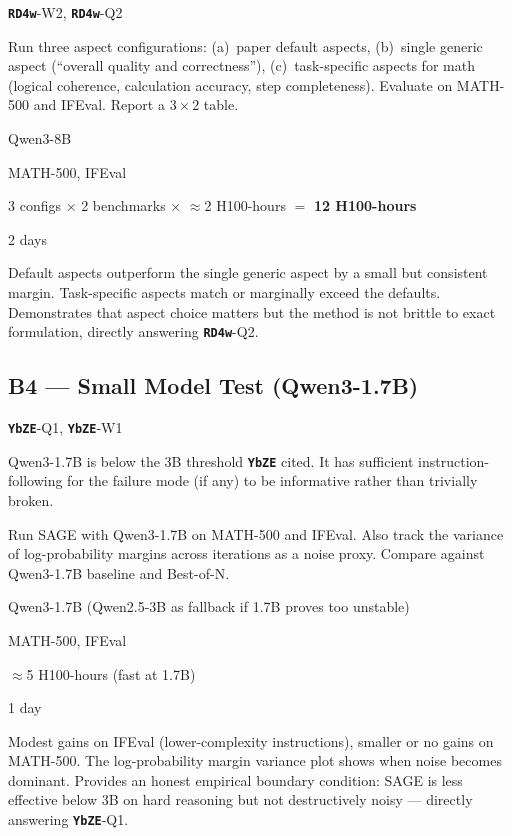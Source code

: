 \documentclass[11pt,a4paper]{article}
\newcommand{\rev}[1]{\texttt{\textbf{#1}}}
\begin{document}
\begin{description}[leftmargin=2cm, style=nextline]
  \item[Covers] \rev{RD4w}-W2, \rev{RD4w}-Q2
  \item[Procedure] Run three aspect configurations: (a)~paper default aspects,
    (b)~single generic aspect (``overall quality and correctness''), (c)~task-specific
    aspects for math (logical coherence, calculation accuracy, step completeness).
    Evaluate on MATH-500 and IFEval. Report a $3 \times 2$ table.
  \item[Model] Qwen3-8B
  \item[Benchmarks] MATH-500, IFEval
  \item[GPU estimate] 3 configs $\times$ 2 benchmarks $\times$ $\approx$2 H100-hours
    $=$ \textbf{12 H100-hours}
  \item[Wall-clock] 2 days
  \item[Expected outcome] Default aspects outperform the single generic aspect by a small but
    consistent margin. Task-specific aspects match or marginally exceed the defaults.
    Demonstrates that aspect choice matters but the method is not brittle to exact
    formulation, directly answering \rev{RD4w}-Q2.
\end{description}

\subsection*{B4 --- Small Model Test (Qwen3-1.7B)}

\begin{description}[leftmargin=2cm, style=nextline]
  \item[Covers] \rev{YbZE}-Q1, \rev{YbZE}-W1
  \item[Rationale] Qwen3-1.7B is below the 3B threshold \rev{YbZE} cited. It has sufficient
    instruction-following for the failure mode (if any) to be informative rather than
    trivially broken.
  \item[Procedure] Run SAGE with Qwen3-1.7B on MATH-500 and IFEval. Also track the variance
    of log-probability margins across iterations as a noise proxy. Compare against Qwen3-1.7B
    baseline and Best-of-N.
  \item[Model] Qwen3-1.7B (Qwen2.5-3B as fallback if 1.7B proves too unstable)
  \item[Benchmarks] MATH-500, IFEval
  \item[GPU estimate] $\approx$5 H100-hours (fast at 1.7B)
  \item[Wall-clock] 1 day
  \item[Expected outcome] Modest gains on IFEval (lower-complexity instructions),
    smaller or no gains on MATH-500. The log-probability margin variance plot shows
    when noise becomes dominant. Provides an honest empirical boundary condition:
    SAGE is less effective below 3B on hard reasoning but not destructively noisy ---
    directly answering \rev{YbZE}-Q1.
\end{description}
\end{document}
